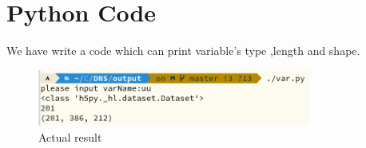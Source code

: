 \section{Python Code}
We have write a code which can print variable's type ,length and shape.
\begin{figure}[htbp]
\centering
    \includegraphics[width=0.8\textwidth]{src/Screenshot from 2021-02-28 16-41-43.png}
\caption{Actual result}
\label{pd}
\end{figure}


